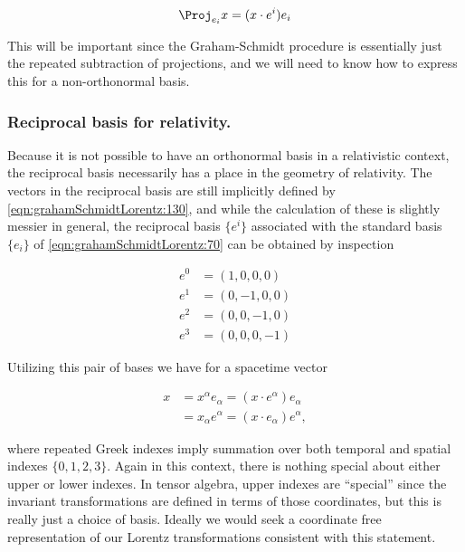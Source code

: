 \begin{equation}\label{eqn:grahamSchmidtLorentz:n}
\Proj_{e_i} x = (x \cdot e^i) e_i
\end{equation}

This will be important since the Graham-Schmidt procedure is essentially just the repeated subtraction of projections, and we will need to know how to express this for a non-orthonormal basis.

\subsubsection{Reciprocal basis for relativity.}

Because it is not possible to have an orthonormal basis in a relativistic context, the reciprocal basis necessarily has a place in the geometry of relativity.  The vectors in the reciprocal basis are still implicitly defined by \ref{eqn:grahamSchmidtLorentz:130}, and while the calculation of these is slightly messier in general, the reciprocal basis $\{e^i\}$ associated with the standard basis $\{e_i\}$ of \ref{eqn:grahamSchmidtLorentz:70} can be obtained by inspection

\begin{equation}\label{eqn:grahamSchmidtLorentz:70b}
\begin{aligned}
e^0 &= (1, 0, 0, 0) \\
e^1 &= (0, -1, 0, 0) \\
e^2 &= (0, 0, -1, 0) \\
e^3 &= (0, 0, 0, -1) 
\end{aligned}
\end{equation}

Utilizing this pair of bases we have for a spacetime vector

\begin{equation}\label{eqn:grahamSchmidtLorentz:331}
\begin{aligned}
x &= x^\alpha e_\alpha = (x \cdot e^\alpha) e_\alpha \\
  &= x_\alpha e^\alpha = (x \cdot e_\alpha) e^\alpha,
\end{aligned}
\end{equation}

where repeated Greek indexes imply summation over both temporal and spatial indexes $\{0, 1, 2, 3\}$.  Again in this context, there is nothing special about either upper or lower indexes.  In tensor algebra, upper indexes are ``special'' since the invariant transformations are defined in terms of those coordinates, but this is really just a choice of basis.  Ideally we would seek a coordinate free representation of our Lorentz transformations consistent with this statement.

